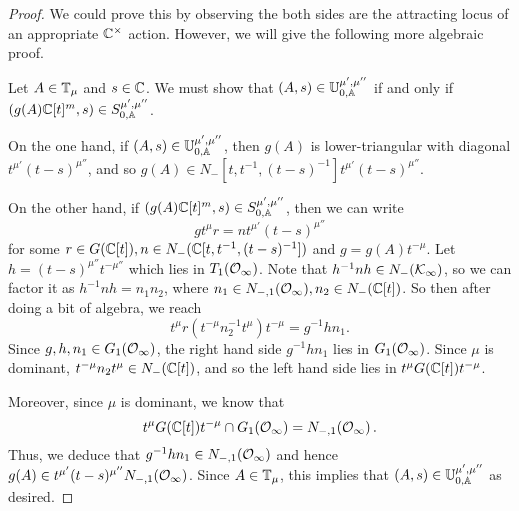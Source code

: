 \documentclass[draft]{article}
\begin{document}
\begin{proof}
We could prove this by observing the both sides are the attracting locus of an appropriate $ \mathbb C^\times$ action. However, we will give the following more algebraic proof.

Let $ A \in \mathbb T_\mu$ and $ s \in \mathbb C $. We must show that  $ (A,s) \in \mathbb U^{\mu', \mu''}_{0,\mathbb A} $ if and only if $ (g(A)\mathbb C[t]^m,s) \in S^{\mu', \mu''}_{0,\mathbb A} $. 

On the one hand, if $ (A,s) \in \mathbb U^{\mu', \mu''}_{0,\mathbb A} $, then $ g(A)$ is lower-triangular with diagonal $ t^{\mu'} (t-s)^{\mu''}$, and so $ g(A) \in N_-[t, t^{-1}, (t-s)^{-1}] t^{\mu'} (t-s)^{\mu''}$. 

On the other hand, if $ (g(A)\mathbb C[t]^m, s) \in S^{\mu', \mu''}_{0,\mathbb A}$, then we can write 
$$
    g t^\mu r= n t^{\mu'} (t-s)^{\mu''}
$$
for some $ r \in G(\mathbb C[t]), n \in N_-(\mathbb C[t, t^{-1}, (t-s)^{-1}]) $ and $ g = g(A)t^{-\mu}$.  Let $ h = (t-s)^{\mu''} t^{-\mu''}$ which lies in $ T_1(\mathcal O_\infty) $. %
Note that $ h^{-1}n h \in N_-(\mathcal K_\infty)$, 
so we can factor it as $ h^{-1} n h  = n_1 n_2 $, where $ n_1 \in N_{-,1}(\mathcal O_\infty), n_2 \in N_-(\mathbb C[t])$.  So then after doing a bit of algebra, we reach
$$
    t^\mu r (t^{-\mu} n_2^{-1} t^\mu) t^{-\mu} = g^{-1} h n_1.
$$
Since $ g, h, n_1 \in G_1(\mathcal O_\infty)$, the right hand side $ g^{-1} h n_1 $ lies in $ G_1(\mathcal O_\infty) $.  Since $ \mu $ is dominant, $ t^{-\mu} n_2 t^\mu \in N_-(\mathbb C[t])$, and so the left hand side lies in $t^\mu G(\mathbb C[t]) t^{-\mu}$.

Moreover, since $ \mu $ is dominant, we know that 
$$
    t^\mu G(\mathbb C[t]) t^{-\mu} \cap G_1(\mathcal O_\infty) = N_{-,1}(\mathcal O_\infty)\,.
$$
Thus, we deduce that $ g^{-1} h n_1 \in N_{-,1}(\mathcal O_\infty)$ 
and hence $ g(A) \in t^{\mu'} (t-s)^{\mu''}N_{-,1}(\mathcal O_\infty) $.  
Since $ A \in \mathbb T_\mu $, this implies that $ (A,s) \in \mathbb U^{\mu', \mu''}_{0,\mathbb A}$ as desired.
\end{proof}
% 
% 
% 
% 
\end{document}

